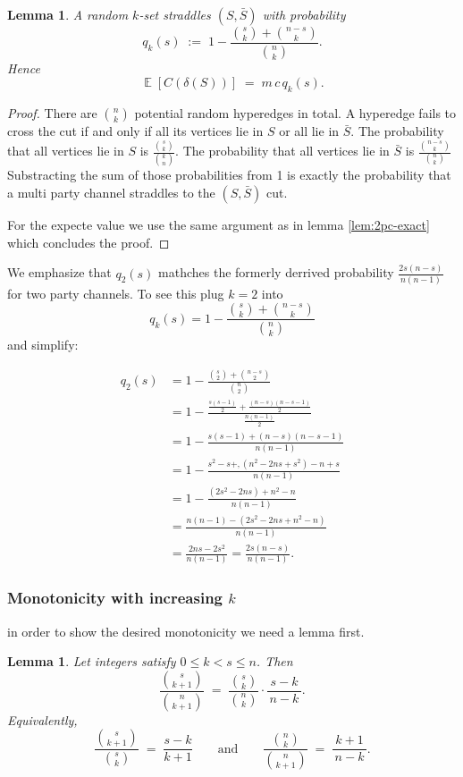 \documentclass[10pt,twocolumn]{article}
\newtheorem{lemma}[theorem]{Lemma}
\DeclareMathOperator{\EE}{\mathbb{E}}
\begin{document}
\begin{lemma}
\label{lem:kpc-exact}
A random $k$-set straddles $(S,\bar S)$ with probability
\[
q_k(s) \;:=\; 1 - \frac{\binom{s}{k}+\binom{n-s}{k}}{\binom{n}{k}}.
\]
Hence
\[
\EE[C(\delta(S))] \;=\; m\,c\, q_k(s).
\]
\end{lemma}

\begin{proof}
  There are $\binom{n}{k}$ potential random hyperedges in total. 
  A hyperedge fails to cross the cut if and only if all its vertices lie in $S$ or all lie in $\bar S$.
  The probability that all vertices lie in $S$ is $\frac{\binom{s}{k}}{\binom{k}{n}}$. The probability that all vertices lie in $\bar S$ is $\frac{\binom{n-s}{k}}{\binom{n}{k}}$
  Substracting the sum of those probabilities from 1 is exactly the probability that a multi party channel straddles to the $(S,\bar S)$ cut.

  For the expecte value we use the same argument as in lemma \ref{lem:2pc-exact}
which concludes the proof.
\end{proof}


We emphasize that $q_2(s)$ mathches the formerly derrived probability $\frac{2s(n-s)}{n(n-1)}$ for two party channels. To see this plug $k=2$ into
\[
q_k(s)=1-\frac{\binom{s}{k}+\binom{n-s}{k}}{\binom{n}{k}}
\]
and simplify:

\begin{equation}
\begin{aligned}
q_2(s)
&=1-\frac{\binom{s}{2}+\binom{n-s}{2}}{\binom{n}{2}} \\
&=1-\frac{\frac{s(s-1)}{2}+\frac{(n-s)(n-s-1)}{2}}{\frac{n(n-1)}{2}}\\
&=1-\frac{s(s-1)+(n-s)(n-s-1)}{n(n-1)}\\
&=1-\frac{s^2-s+,(n^2-2ns+s^2)-n+s}{n(n-1)}\\
&=1-\frac{(2s^2-2ns)+n^2-n}{n(n-1)}\\
&=\frac{n(n-1)-(2s^2-2ns+n^2-n)}{n(n-1)}\\
&=\frac{2ns-2s^2}{n(n-1)}
=\boxed{\frac{2s(n-s)}{n(n-1)}}.
\end{aligned}
\end{equation}

\subsubsection{Monotonicity with increasing $k$}

in order to show the desired monotonicity we need a lemma first.
\begin{lemma}\label{lem:binom-step}
Let integers satisfy $0\le k < s \le n$. Then
\[
\frac{\binom{s}{k+1}}{\binom{n}{k+1}}
\;=\;
\frac{\binom{s}{k}}{\binom{n}{k}}\cdot \frac{s-k}{\,n-k\,}.
\]
Equivalently,
\[
\frac{\binom{s}{k+1}}{\binom{s}{k}}
\;=\;
\frac{s-k}{k+1}
\qquad\text{and}\qquad
\frac{\binom{n}{k}}{\binom{n}{k+1}}
\;=\;
\frac{k+1}{\,n-k\,}.
\]
\end{lemma}
\end{document}
